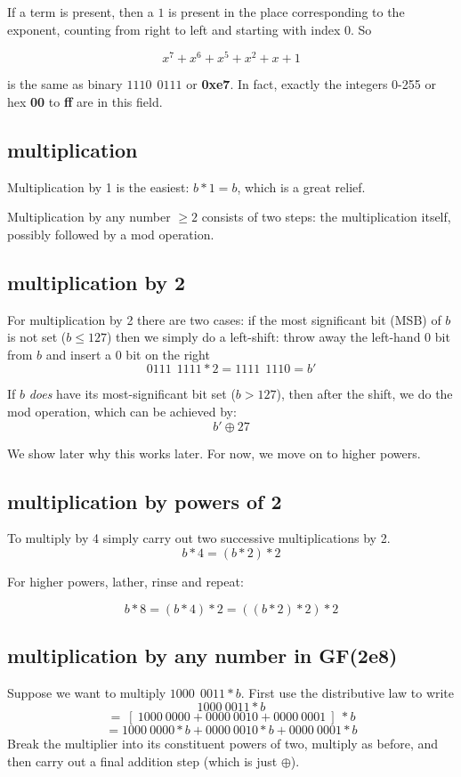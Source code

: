\documentclass[11pt, oneside]{article}
\begin{document}
If a term is present, then a $1$ is present in the place corresponding to the exponent, counting from right to left and starting with index 0. So

\[ x^7 + x^6 + x^5 + x^2 + x + 1 \]

is the same as binary $1110 \  \  0111$ or \textbf{0xe7}.  In fact, exactly the integers 0-255 or hex \textbf{00} to \textbf{ff} are in this field.

\subsection*{multiplication}

Multiplication by 1 is the easiest:  $b * 1 = b$, which is a great relief.

Multiplication by any number $\ge 2$ consists of two steps:  the multiplication itself, possibly followed by a mod operation.

\subsection*{multiplication by 2}

For multiplication by 2 there are two cases:  if the most significant bit (MSB) of $b$ is not set ($b \le 127$) then we simply do a left-shift:  throw away the left-hand 0 bit from $b$ and insert a $0$ bit on the right
\[ 0111 \  \  1111 * 2 =  1111 \  \  1110 = b' \]

If $b$ \emph{does} have its most-significant bit set ($b > 127$), then after the shift, we do the mod operation, which can be achieved by:
\[ b' \oplus 27 \]

We show later why this works later.  For now, we move on to higher powers.

\subsection*{multiplication by powers of 2}

To multiply by 4 simply carry out two successive multiplications by 2.
\[ b * 4 = (b * 2) * 2 \]

For higher powers, lather, rinse and repeat:

\[ b * 8 = (b * 4) * 2 = ((b * 2) * 2) * 2 \]

\subsection*{multiplication by any number in GF(2e8)}
Suppose we want to multiply $ 1000 \  \  0011 * b$.  First use the distributive law to write
\[ 1000 \   0011 * b \]
\[ = \ [ \ 1000 \   0000  + 0000 \  0010  + 0000 \   0001 \ ] \ * b \]
\[ = 1000 \  0000 * b + 0000 \  0010 * b + 0000 \  0001 * b \]
Break the multiplier into its constituent powers of two, multiply as before, and then carry out a final  addition step (which is just $\oplus$).
\end{document}
